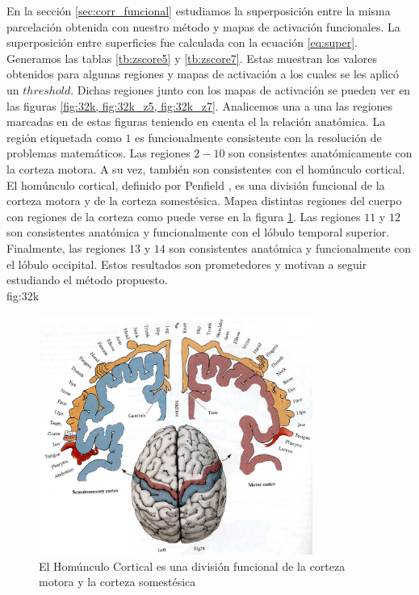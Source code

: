 En la secci\'on \ref{sec:corr_funcional} estudiamos la superposici\'on 
entre la misma parcelaci\'on obtenida con nuestro m\'etodo y mapas de 
activaci\'on funcionales. La superposici\'on entre superficies fue 
calculada con la ecuaci\'on \ref{eq:super}. Generamos las tablas 
\ref{tb:zscore5} y \ref{tb:zscore7}. Estas muestran los valores obtenidos
para algunas regiones y mapas de activaci\'on a los cuales se les aplic\'o
un $threshold$. Dichas regiones junto con los mapas de activaci\'on se 
pueden ver en las figuras \ref{fig:32k, fig:32k_z5, fig:32k_z7}. Analicemos
una a una las regiones marcadas en de estas figuras teniendo en cuenta el 
la relaci\'on anat\'omica. La regi\'on etiquetada como $1$ es
funcionalmente consistente
con la resoluci\'on de problemas matem\'aticos. Las regiones $2-10$ son
consistentes anat\'omicamente con la corteza motora. A su vez, tambi\'en
son consistentes con el hom\'unculo cortical. El hom\'unculo cortical,
definido por Penfield \cite{Penfield1954}, es una divisi\'on funcional de
la corteza motora y de la corteza somest\'esica. Mapea distintas 
regiones del cuerpo con regiones de la corteza como puede verse en la
figura \ref{fig:homunculo}. Las regiones $11$ y $12$ son consistentes 
anat\'omica y funcionalmente con el l\'obulo temporal superior.
Finalmente, las regiones $13$ y $14$ son consistentes anat\'omica y
funcionalmente con el l\'obulo occipital. Estos resultados son prometedores
y motivan a seguir estudiando el m\'etodo propuesto.\\fig:32k

\begin{figure}[h!]
    \centering
    \includegraphics[width=0.8\textwidth]{img/homunculus.jpg}
    \caption{El Hom\'unculo Cortical es una divisi\'on funcional de la 
             corteza motora y la corteza somest\'esica }
    \label{fig:homunculo}
\end{figure}

